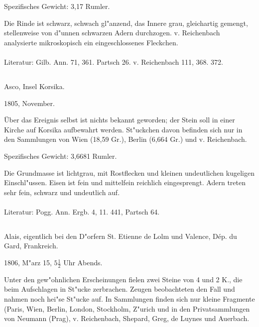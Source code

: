 \documentclass[a4paper, 11pt, oneside]{article}
\begin{document}
Spezifisches Gewicht: 3,17 Rumler.

Die Rinde ist schwarz, schwach gl"anzend, das Innere grau, gleichartig gemengt, stellenweise von d"unnen schwarzen Adern durchzogen. v. Reichenbach analysierte mikroskopisch ein eingeschlossenes Fleckchen.
\normalsize
\paragraph{}
Literatur: Gilb. Ann. 71, 361. Partsch 26. v. Reichenbach 111, 368. 372.
\subsection{}
\LARGE
\paragraph{}
Asco, Insel Korsika.

1805, November.

Über das Ereignis selbst ist nichts bekannt geworden; der Stein soll in einer Kirche auf Korsika aufbewahrt werden. St"uckchen davon befinden sich nur in den Sammlungen von Wien (18,59 Gr.), Berlin (6,664 Gr.) und v. Reichenbach.

Spezifisches Gewicht: 3,6681 Rumler.

Die Grundmasse ist lichtgrau, mit Rostflecken und kleinen undeutlichen kugeligen Einschl"ussen. Eisen ist fein und mittelfein reichlich eingesprengt. Adern treten sehr fein, schwarz und undeutlich auf.
\normalsize
\paragraph{}
Literatur: Pogg. Ann. Ergb. 4, 11. 441, Partsch 64.
\subsection{}
\LARGE
\paragraph{}
Alais, eigentlich bei den D"orfern St. Etienne de Lolm und Valence, Dép. du Gard, Frankreich.

1806, M"arz 15, $\mathfrak{5\frac{1}{2}}$ Uhr Abends.

Unter den gew"ohnlichen Erscheinungen fielen zwei Steine von 4 und 2 K., die beim Aufschlagen in St"ucke zerbrachen. Zeugen beobachteten den Fall und nahmen noch hei"se St"ucke auf. In Sammlungen finden sich nur kleine Fragmente (Paris, Wien, Berlin, London, Stockholm, Z"urich und in den Privatsammlungen von Neumann (Prag), v. Reichenbach, Shepard, Greg, de Luynes und Auerbach.
\end{document}
